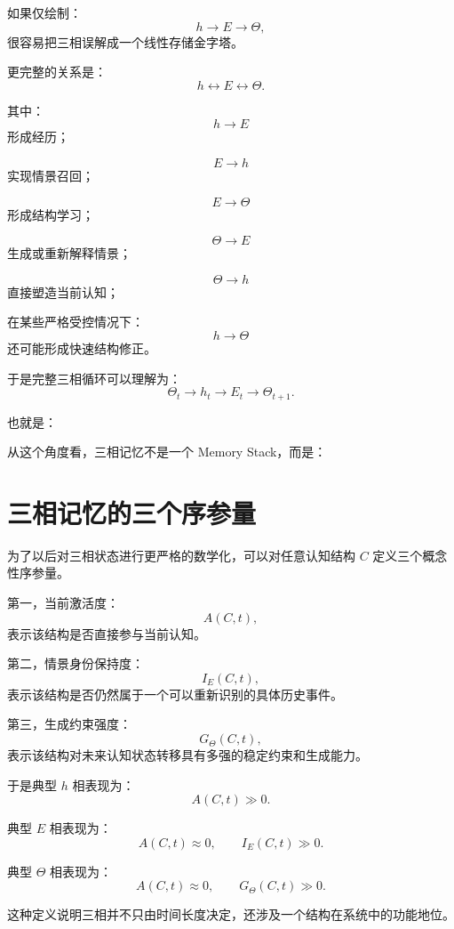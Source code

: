 如果仅绘制：
\[
h\rightarrow E\rightarrow\Theta,
\]
很容易把三相误解成一个线性存储金字塔。

更完整的关系是：
\[
\boxed{
h
\leftrightarrow
E
\leftrightarrow
\Theta.
}
\]

其中：
\[
h\rightarrow E
\]
形成经历；

\[
E\rightarrow h
\]
实现情景召回；

\[
E\rightarrow\Theta
\]
形成结构学习；

\[
\Theta\rightarrow E
\]
生成或重新解释情景；

\[
\Theta\rightarrow h
\]
直接塑造当前认知；

在某些严格受控情况下：
\[
h\rightarrow\Theta
\]
还可能形成快速结构修正。

于是完整三相循环可以理解为：
\[
\boxed{
\Theta_t
\rightarrow
h_t
\rightarrow
E_t
\rightarrow
\Theta_{t+1}.
}
\]

也就是：
\begin{statementbox}
\centering
{}
\end{statementbox}

从这个角度看，三相记忆不是一个 Memory Stack，而是：
\begin{statementbox}
\centering
{}
\end{statementbox}

\section{三相记忆的三个序参量}

为了以后对三相状态进行更严格的数学化，可以对任意认知结构 $C$ 定义三个概念性序参量。

第一，当前激活度：
\[
A(C,t),
\]
表示该结构是否直接参与当前认知。

第二，情景身份保持度：
\[
I_E(C,t),
\]
表示该结构是否仍然属于一个可以重新识别的具体历史事件。

第三，生成约束强度：
\[
G_\Theta(C,t),
\]
表示该结构对未来认知状态转移具有多强的稳定约束和生成能力。

于是典型 $h$ 相表现为：
\[
A(C,t)\gg0.
\]

典型 $E$ 相表现为：
\[
A(C,t)\approx0,
\qquad
I_E(C,t)\gg0.
\]

典型 $\Theta$ 相表现为：
\[
A(C,t)\approx0,
\qquad
G_\Theta(C,t)\gg0.
\]

这种定义说明三相并不只由时间长度决定，还涉及一个结构在系统中的功能地位。

